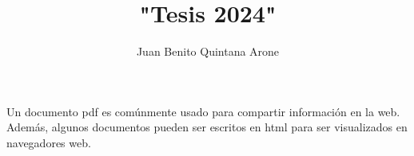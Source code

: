 \documentclass[12pt,a4paper,oneside]{book}
\author{Juan Benito Quintana Arone}
\title{"Tesis 2024"}
\begin{document}
\frontmatter
    
    
    
    \tableofcontents
    \newpage
	\listoftables
	\newpage
	\listoffigures
	\newpage
    

\mainmatter     
    
    
    
    

    
    
    
    
    
     
    
Un documento \ac{pdf} es comúnmente usado para compartir información en la web. Además, algunos documentos pueden ser escritos en \ac{html} para ser visualizados en navegadores web.
\cite{Einstein1905}
\backmatter
    \appendix
    
    \printbibliography
\end{document}
